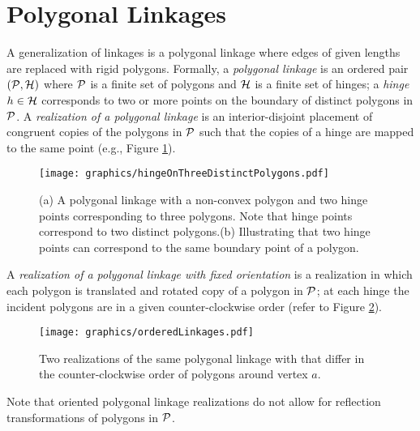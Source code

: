 \documentclass[10pt]{CSUNthesis}
\theoremstyle{plain}%
\theoremstyle{definition}
\theoremstyle{remark}
\newcommand{\HH}{{\cal H}} %
\renewcommand{\PP}{{\cal P}} %
\begin{document}
\section{Polygonal Linkages}
A generalization of linkages is a polygonal linkage where edges of given lengths are replaced with rigid polygons.
Formally, a \textit{polygonal linkage} is an ordered pair $\left(\PP,\HH \right)$ where $\PP$ is a finite set of polygons and $\HH$ is a finite set of hinges; a \textit{hinge} $h\in \HH$ corresponds to two or more points on the boundary of distinct polygons in $\PP$.  
A \emph{realization of a polygonal linkage} is an interior-disjoint placement of congruent copies of the polygons in $\PP$ such that the copies of a hinge are mapped to the same point (e.g., Figure \ref{fig:linkage-1}).  
\begin{figure}[!htbp]
\begin{center}
\texttt{[image: graphics/hingeOnThreeDistinctPolygons.pdf]}
\end{center} 
\caption{(a) A polygonal linkage with a non-convex polygon and two hinge points corresponding to 
three polygons.  Note that hinge points correspond to two distinct polygons.(b) Illustrating that 
two hinge points can correspond to the same boundary point of a polygon.}
\label{fig:linkage-1}
\end{figure}
A \textit{realization of a polygonal linkage with fixed orientation} is a realization in which each polygon is translated and rotated copy of a polygon in $\PP$; at each hinge the incident polygons are in a given counter-clockwise order (refer to Figure \ref{fig:orderedLinkages}).
\begin{figure}[!htbp]\label{fig:orderedLinkages}
\begin{center}
\texttt{[image: graphics/orderedLinkages.pdf]}
\end{center} 
\caption{Two realizations of the same polygonal linkage with that differ in the counter-clockwise order of polygons around vertex $a$. }
\end{figure}
Note that oriented polygonal linkage realizations do not allow for reflection transformations of polygons in $\PP$.
\end{document}
